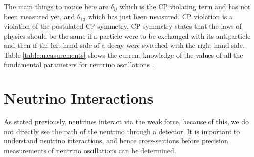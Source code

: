 The main things to notice here are $\delta_{ij}$ which is the CP violating term and has not been measured yet, and $\theta_{13}$ which has just been measured. CP violation is a violation of the postulated CP-symmetry. CP-symmetry states that the laws of physics should be the same if a particle were to be exchanged with its antiparticle and then if the left hand side of a decay were switched with the right hand side. Table \ref{table:measurements} shows the current knowledge of the values of all the fundamental parameters for neutrino oscillations \cite{pdg}. 
\begin{table}[htp!]
\centering
\caption{Current knowledge of neutrino oscillation parameters \cite{pdg}}
\label{table:measurements}
\end{table}

\section{Neutrino Interactions}
As stated previously, neutrinos interact via the weak force, because of this, we do not directly see the path of the neutrino through a detector. It is important to understand neutrino interactions, and hence cross-sections before precision measurements of neutrino oscillations can be determined. 
